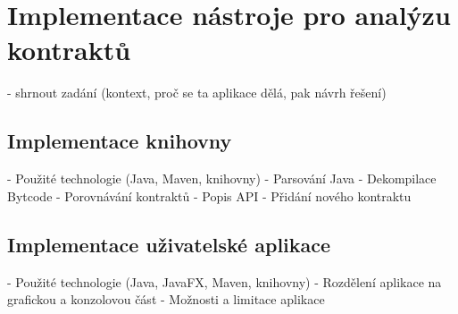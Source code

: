 \chapter{Implementace nástroje pro analýzu kontraktů}

 - shrnout zadání (kontext, proč se ta aplikace dělá, pak návrh řešení) 

\section{Implementace knihovny}
    - Použité technologie (Java, Maven, knihovny)
    - Parsování Java
    - Dekompilace Bytcode
    - Porovnávání kontraktů
    - Popis API
    - Přidání nového kontraktu
    
\section{Implementace uživatelské aplikace}
   - Použité technologie (Java, JavaFX, Maven, knihovny)
   - Rozdělení aplikace na grafickou a konzolovou část
   - Možnosti a limitace aplikace